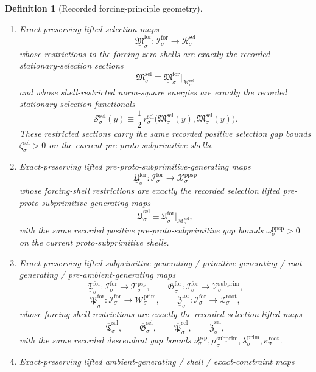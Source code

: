 \documentclass[11pt]{article}
\newcommand{\RootTarget}[1]{\mathcal Z_{#1}^{\mathrm{root}}}
\newcommand{\RootGap}[1]{\kappa_{#1}^{\mathrm{root}}}
\newcommand{\PrimTarget}[1]{\mathcal W_{#1}^{\mathrm{prim}}}
\newcommand{\PrimGap}[1]{\lambda_{#1}^{\mathrm{prim}}}
\newcommand{\SubprimTarget}[1]{\mathcal V_{#1}^{\mathrm{subprim}}}
\newcommand{\SubprimGap}[1]{\mu_{#1}^{\mathrm{subprim}}}
\newcommand{\ProtoSubprimTarget}[1]{\mathcal T_{#1}^{\mathrm{psp}}}
\newcommand{\ProtoSubprimGap}[1]{\nu_{#1}^{\mathrm{psp}}}
\newcommand{\PreProtoSubprimTarget}[1]{\mathcal X_{#1}^{\mathrm{ppsp}}}
\newcommand{\PreProtoSubprimGap}[1]{\omega_{#1}^{\mathrm{ppsp}}}
\newcommand{\SelSpace}[1]{\mathcal M_{#1}^{\mathrm{sel}}}
\newcommand{\SelTarget}[1]{\mathcal R_{#1}^{\mathrm{sel}}}
\newcommand{\SelTargetMetric}[1]{r_{#1}^{\mathrm{sel}}}
\newcommand{\SelGap}[1]{\zeta_{#1}^{\mathrm{sel}}}
\newcommand{\SelSection}[1]{\mathfrak M_{#1}^{\mathrm{sel}}}
\newcommand{\SelFunctional}[1]{\mathscr S_{#1}^{\mathrm{sel}}}
\newcommand{\SelLiftedPreProto}[1]{\overline{\mathfrak U}_{#1}^{\mathrm{sel}}}
\newcommand{\SelLiftedSubprimitive}[1]{\overline{\mathfrak T}_{#1}^{\mathrm{sel}}}
\newcommand{\SelLiftedPrimitive}[1]{\overline{\mathfrak G}_{#1}^{\mathrm{sel}}}
\newcommand{\SelLiftedRoot}[1]{\overline{\mathfrak P}_{#1}^{\mathrm{sel}}}
\newcommand{\SelLiftedPreAmbient}[1]{\overline{\mathfrak Z}_{#1}^{\mathrm{sel}}}
\newcommand{\ForSpace}[1]{\mathcal I_{#1}^{\mathrm{for}}}
\newcommand{\ForMetric}[1]{I_{#1}^{\mathrm{for}}}
\newcommand{\ForGap}[1]{\alpha_{#1}^{\mathrm{for}}}
\newcommand{\ForLiftedSelection}[1]{\underline{\mathfrak M}_{#1}^{\mathrm{for}}}
\newcommand{\ForLiftedPreProto}[1]{\underline{\mathfrak U}_{#1}^{\mathrm{for}}}
\newcommand{\ForLiftedSubprimitive}[1]{\underline{\mathfrak T}_{#1}^{\mathrm{for}}}
\newcommand{\ForLiftedPrimitive}[1]{\underline{\mathfrak G}_{#1}^{\mathrm{for}}}
\newcommand{\ForLiftedRoot}[1]{\underline{\mathfrak P}_{#1}^{\mathrm{for}}}
\newcommand{\ForLiftedPreAmbient}[1]{\underline{\mathfrak Z}_{#1}^{\mathrm{for}}}
\newtheorem{definition}{Definition}
\begin{document}
\begin{definition}[Recorded forcing-principle geometry]
\begin{enumerate}
\begin{equation}
    \qquad
    \ForGap{\sigma}>0,
    \label{eq:recorded_forcing_gap}
    \end{equation}
    for all \(z\in\SelSpace{\sigma}\) and all \(\xi\) orthogonal, with respect to \(\ForMetric{\sigma}\), to \(T_z\SelSpace{\sigma}\).
    \item Exact-preserving lifted selection maps
    \[
    \ForLiftedSelection{\sigma}:\ForSpace{\sigma}\to\SelTarget{\sigma}
    \]
    whose restrictions to the forcing zero shells are exactly the recorded stationary-selection sections
    \[
    \SelSection{\sigma}\equiv \ForLiftedSelection{\sigma}|_{\SelSpace{\sigma}}
    \]
    and whose shell-restricted norm-square energies are exactly the recorded stationary-selection functionals
    \[
    \SelFunctional{\sigma}(y)\equiv \frac12\,
    \SelTargetMetric{\sigma}\bigl(\SelSection{\sigma}(y),\SelSection{\sigma}(y)\bigr).
    \]
    These restricted sections carry the same recorded positive selection gap bounds \(\SelGap{\sigma}>0\) on the current pre-proto-subprimitive shells.
    \item Exact-preserving lifted pre-proto-subprimitive-generating maps
    \[
    \ForLiftedPreProto{\sigma}:\ForSpace{\sigma}\to\PreProtoSubprimTarget{\sigma}
    \]
    whose forcing-shell restrictions are exactly the recorded selection lifted pre-proto-subprimitive-generating maps
    \[
    \SelLiftedPreProto{\sigma}\equiv \ForLiftedPreProto{\sigma}|_{\SelSpace{\sigma}},
    \]
    with the same recorded positive pre-proto-subprimitive gap bounds \(\PreProtoSubprimGap{\sigma}>0\) on the current proto-subprimitive shells.
    \item Exact-preserving lifted subprimitive-generating / primitive-generating / root-generating / pre-ambient-generating maps
    \[
    \ForLiftedSubprimitive{\sigma}:\ForSpace{\sigma}\to\ProtoSubprimTarget{\sigma},\qquad
    \ForLiftedPrimitive{\sigma}:\ForSpace{\sigma}\to\SubprimTarget{\sigma},
    \]
    \[
    \ForLiftedRoot{\sigma}:\ForSpace{\sigma}\to\PrimTarget{\sigma},\qquad
    \ForLiftedPreAmbient{\sigma}:\ForSpace{\sigma}\to\RootTarget{\sigma},
    \]
    whose forcing-shell restrictions are exactly the recorded selection lifted maps
    \[
    \SelLiftedSubprimitive{\sigma},\qquad
    \SelLiftedPrimitive{\sigma},\qquad
    \SelLiftedRoot{\sigma},\qquad
    \SelLiftedPreAmbient{\sigma},
    \]
    with the same recorded descendant gap bounds \(\ProtoSubprimGap{\sigma},\SubprimGap{\sigma},\PrimGap{\sigma},\RootGap{\sigma}\).
    \item Exact-preserving lifted ambient-generating / shell / exact-constraint maps

\end{enumerate}
\end{definition}
\end{document}
